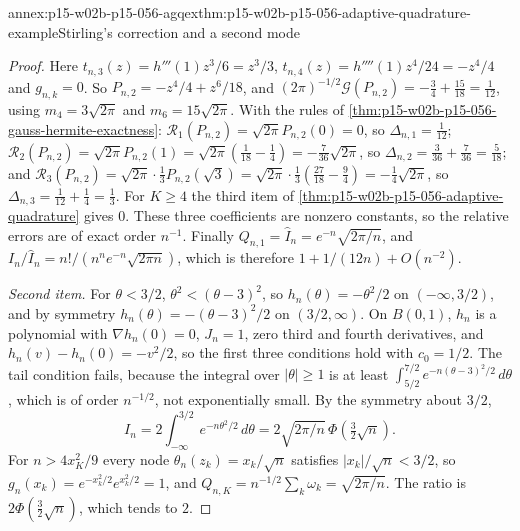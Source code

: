 \begin{annexitem}{annex:p15-w02b-p15-056-agqex}{thm:p15-w02b-p15-056-adaptive-quadrature-example}{Stirling's correction and a second mode}
\begin{proof}
Here \(t_{n,3}(z)=h'''(1)z^3/6=z^3/3\), \(t_{n,4}(z)=h''''(1)z^4/24=-z^4/4\)
and \(g_{n,k}=0\). So \(P_{n,2}=-z^4/4+z^6/18\), and
\((2\pi)^{-1/2}\mathcal G(P_{n,2})=-\tfrac34+\tfrac{15}{18}=\tfrac1{12}\),
using \(m_4=3\sqrt{2\pi}\) and \(m_6=15\sqrt{2\pi}\). With the rules of
\cref{thm:p15-w02b-p15-056-gauss-hermite-exactness}:
\(\mathcal R_1(P_{n,2})=\sqrt{2\pi}P_{n,2}(0)=0\), so
\(\Delta_{n,1}=\tfrac1{12}\);
\(\mathcal R_2(P_{n,2})=\sqrt{2\pi}P_{n,2}(1)=\sqrt{2\pi}(\tfrac1{18}-\tfrac14)
=-\tfrac7{36}\sqrt{2\pi}\), so \(\Delta_{n,2}=\tfrac3{36}+\tfrac7{36}=\tfrac5{18}\);
and
\(\mathcal R_3(P_{n,2})=\sqrt{2\pi}\cdot\tfrac13P_{n,2}(\sqrt3)
=\sqrt{2\pi}\cdot\tfrac13(\tfrac{27}{18}-\tfrac94)=-\tfrac14\sqrt{2\pi}\), so
\(\Delta_{n,3}=\tfrac1{12}+\tfrac14=\tfrac13\). For \(K\geq4\) the third
item of \cref{thm:p15-w02b-p15-056-adaptive-quadrature} gives \(0\).
These three coefficients are nonzero constants, so the relative errors
are of exact order \(n^{-1}\). Finally \(Q_{n,1}=\widehat I_n=e^{-n}\sqrt{2\pi/n}\),
and \(I_n/\widehat I_n=n!/(n^ne^{-n}\sqrt{2\pi n})\), which is therefore
\(1+1/(12n)+O(n^{-2})\).

\emph{Second item.} For \(\theta<3/2\), \(\theta^2<(\theta-3)^2\), so
\(h_n(\theta)=-\theta^2/2\) on \((-\infty,3/2)\), and by symmetry
\(h_n(\theta)=-(\theta-3)^2/2\) on \((3/2,\infty)\). On \(B(0,1)\),
\(h_n\) is a polynomial with \(\nabla h_n(0)=0\), \(J_n=1\), zero third
and fourth derivatives, and \(h_n(v)-h_n(0)=-v^2/2\), so the first three
conditions hold with \(c_0=1/2\). The tail condition fails, because the
integral over \(|\theta|\geq1\) is at least
\(\int_{5/2}^{7/2}e^{-n(\theta-3)^2/2}\,d\theta\), which is of order
\(n^{-1/2}\), not exponentially small. By the symmetry about \(3/2\),
\[
 I_n=2\int_{-\infty}^{3/2}e^{-n\theta^2/2}\,d\theta
 =2\sqrt{2\pi/n}\,\Phi(\tfrac32\sqrt n).
\]
For \(n>4x_K^2/9\) every node \(\theta_n(z_k)=x_k/\sqrt n\) satisfies
\(|x_k|/\sqrt n<3/2\), so \(g_n(x_k)=e^{-x_k^2/2}e^{x_k^2/2}=1\), and
\(Q_{n,K}=n^{-1/2}\sum_k\omega_k=\sqrt{2\pi/n}\). The ratio is
\(2\Phi(\tfrac32\sqrt n)\), which tends to \(2\).
\end{proof}
\end{annexitem}

